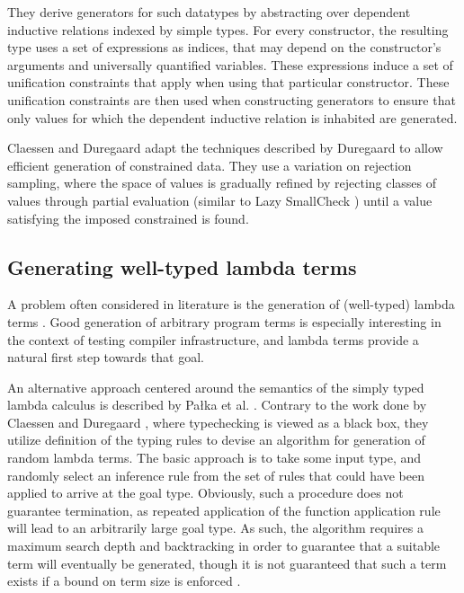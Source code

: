 \documentclass[a4paper,msc,twosized=semi]{uustthesis}
\begin{document}
  They derive generators for such datatypes by abstracting over dependent inductive relations indexed by simple types. For every constructor, the resulting type uses a set of expressions as indices, that may depend on the constructor's arguments and universally quantified variables. These expressions induce a set of unification constraints that apply when using that particular constructor. These unification constraints are then used when constructing generators to ensure that only values for which the dependent inductive relation is inhabited are generated. 

   Claessen and Duregaard \cite{claessen2015generating} adapt the techniques described by Duregaard \cite{duregaard2013feat} to allow efficient generation of constrained data. They use a variation on rejection sampling, where the space of values is gradually refined by rejecting classes of values through partial evaluation (similar to Lazy SmallCheck \cite{runciman2008smallcheck}) until a value satisfying the imposed constrained is found. 

\subsection{Generating well-typed lambda terms}

  A problem often considered in literature is the generation of (well-typed) lambda 
  terms \cite{palka2011testing, grygiel2013counting, claessen2015generating}. Good 
  generation of arbitrary program terms is especially interesting in the context of 
  testing compiler infrastructure, and lambda terms provide a natural first step 
  towards that goal. 

  An alternative approach centered around the semantics of the simply typed lambda 
  calculus is described by Pa{\l}ka et al. \cite{palka2011testing}. Contrary to the 
  work done by Claessen and Duregaard \cite{claessen2015generating}, where 
  typechecking is viewed as a black box, they utilize definition of the typing rules 
  to devise an algorithm for generation of random lambda terms. The basic approach is 
  to take some input type, and randomly select an inference rule from the set of rules 
  that could have been applied to arrive at the goal type. Obviously, such a procedure 
  does not guarantee termination, as repeated application of the function application 
  rule will lead to an arbitrarily large goal type. As such, the algorithm requires a 
  maximum search depth and backtracking in order to guarantee that a suitable term 
  will eventually be generated, though it is not guaranteed that such a term exists if 
  a bound on term size is enforced \cite{moczurad2000statistical}. 
\end{document}
